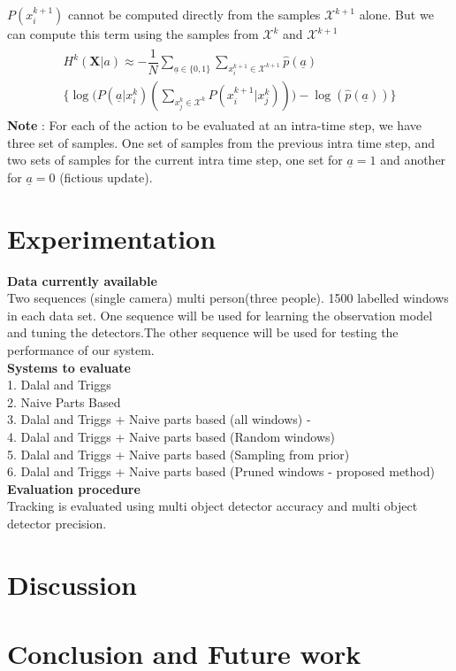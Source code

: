 \documentclass[10pt,twocolumn,letterpaper]{article}
\begin{document}
$P(x^{k+1}_{i})$ cannot be computed directly from the samples $\mathcal{X}^{k+1}$ alone. But we can compute this term using the samples from $\mathcal{X}^{k}$ and $\mathcal{X}^{k+1}$
\begin{align}
\begin{split}
H^{k}(\textbf{X}| a)\approx -\dfrac{1}{N}\sum_{\underline{a}\in\lbrace 0 ,1 \rbrace} \sum_{x_{i}^{k+1}\in\mathcal{X}^{k+1}} \widehat{p}( \underline{a}) \\ \Big\lbrace\log\Big(P( \underline{a}|x^{k}_{i})(\sum_{x_{j}^{k}\in\mathcal{X}^{k}}P(x^{k+1}_{i}|x^{k}_{j}))\Big) - \log(\widehat{p}( \underline{a}))\Big\rbrace
\end{split}
\end{align}
\textbf{Note} :
For each of the action to be evaluated at an intra-time step, we have three set of samples. One set of samples from the previous intra time step, and two sets of samples for the current intra time step, one set for $\underline{a}=1$ and another for $\underline{a}=0$ (fictious update).
  
\section{Experimentation} \label{sec:exp}

\textbf{Data currently available}\\ 
Two sequences (single camera) multi person(three people). 1500 labelled windows in each data set. One sequence will be used for learning the observation model and tuning the detectors.The other sequence will be used for testing the performance of our system.\\

\textbf{Systems to evaluate}\\
1. Dalal and Triggs\\ 
2. Naive Parts Based\\ 
3. Dalal and Triggs + Naive parts based (all windows) - \\
4. Dalal and Triggs + Naive parts based (Random windows)\\
5. Dalal and Triggs + Naive parts based (Sampling from prior)\\
6. Dalal and Triggs + Naive parts based (Pruned windows - proposed method)\\
 

\textbf{Evaluation procedure}\\
Tracking is evaluated using multi object detector accuracy and multi object detector precision.

\section{Discussion}


\section{Conclusion and Future work}
{\small


}
\end{document}
